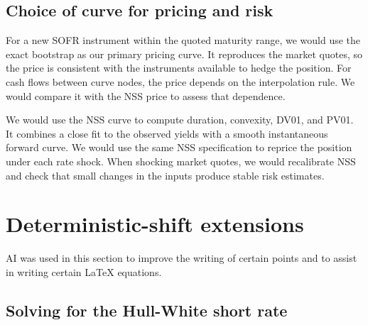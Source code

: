 \documentclass[11pt,a4paper]{article}
\begin{document}
\subsection{Choice of curve for pricing and risk}
\label{subsec:2d}

For a new SOFR instrument within the quoted maturity range, we
would use the exact bootstrap as our primary pricing curve.
It reproduces the market quotes, so the price is consistent
with the instruments available to hedge the position. For cash
flows between curve nodes, the price depends on the interpolation
rule. We would compare it with the NSS price to assess that
dependence.

We would use the NSS curve to compute duration, convexity,
DV01, and PV01. It combines a close fit to the observed yields
with a smooth instantaneous forward curve. We would use the
same NSS specification to reprice the position under each rate
shock. When shocking market quotes, we would recalibrate NSS
and check that small changes in the inputs produce stable risk
estimates.


\section{Deterministic-shift extensions}
AI was used in this section to improve the writing of certain points and to assist in writing certain LaTeX equations.
\subsection{Solving for the Hull-White short rate}\label{subsec:3a}
\end{document}
